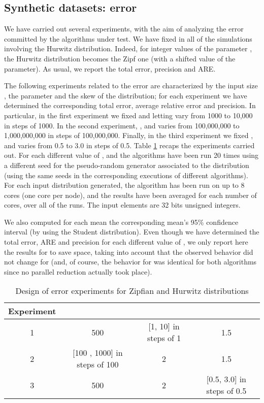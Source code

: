 \documentclass[final,3p,times]{elsarticle}
\begin{document}
\subsection{Synthetic datasets: error}
\label{error}
We have carried out several experiments, with the aim of analyzing the error committed by the algorithms under test. We have fixed  in all of the simulations involving the Hurwitz distribution. Indeed, for integer values of the parameter , the Hurwitz distribution becomes the Zipf one (with a shifted value of the  parameter). As usual, we report the total error, precision and ARE. 

The following experiments related to the error are characterized by the input size , the parameter  and the skew  of the distribution; for each experiment we have determined the corresponding total error,  average relative error and precision. In particular, in the first experiment we fixed  and  letting  vary from 1000 to 10,000 in steps of 1000. In the second experiment, ,  and  varies from 100,000,000 to 1,000,000,000 in steps of 100,000,000. Finally, in the third experiment we fixed ,  and  varies from 0.5 to 3.0 in steps of 0.5. Table \ref{error-experiments} recaps the experiments carried out. For each different value of ,  and  the algorithms have been run 20 times using a different seed for the pseudo-random generator associated to the distribution (using the same seeds in the corresponding executions of different algorithms). For each input distribution generated, the algorithm has been run on up to 8 cores (one core per node), and the results have been averaged for each number of cores, over all of the runs. The input elements are 32 bits unsigned integers.

We also computed for each mean the corresponding mean's 95\% confidence interval (by using the Student  distribution). Even though we have determined the total error, ARE and precision for each different value of , we only report here the results for  to save space, taking into account that the observed behavior did not change for  (and, of course, the behavior for  was identical for both algorithms since no parallel reduction actually took place).



\begin{table}
\renewcommand{\arraystretch}{1.3}
 \caption{Design of  error experiments for Zipfian and Hurwitz distributions }
      \label{error-experiments}
	\centering
	\tiny
	    \begin{tabular}{|c|c|c|c|}
    \hline
    Experiment &  &  &   \\ \hline
    1 &  500 &[1, 10] in steps of 1 & 1.5 \\ \hline
    2 &  [100 , 1000] in steps of 100 & 2 & 1.5 \\ \hline
    3 &  500 & 2 & [0.5, 3.0] in steps of 0.5 \\ \hline
    \end{tabular}
    \normalsize
    \end{table}
\end{document}
